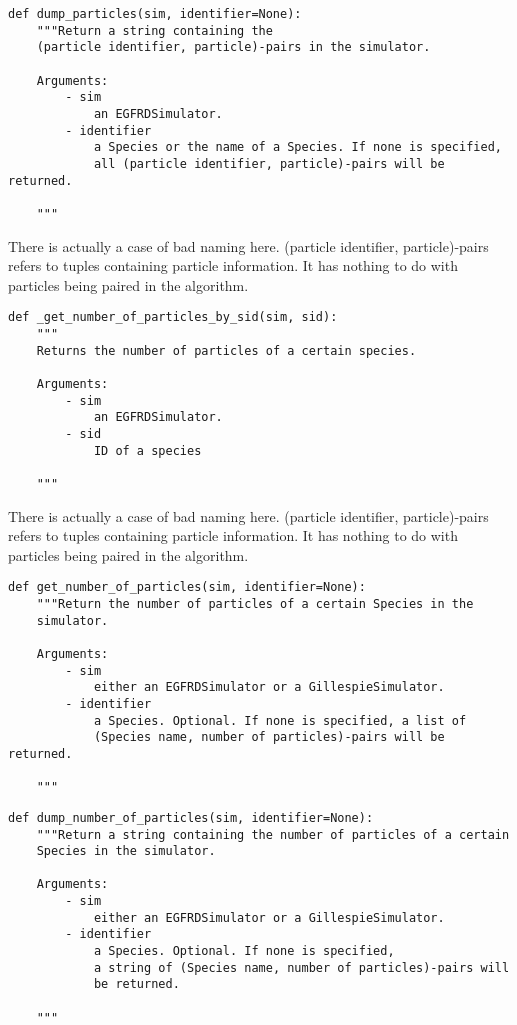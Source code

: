 \documentclass[a4paper,10pt]{article}
\begin{document}
\begin{verbatim}
def dump_particles(sim, identifier=None):
    """Return a string containing the
    (particle identifier, particle)-pairs in the simulator.

    Arguments:
        - sim
            an EGFRDSimulator.
        - identifier
            a Species or the name of a Species. If none is specified, 
            all (particle identifier, particle)-pairs will be returned.

    """
\end{verbatim}
There is actually a case of bad naming here. (particle identifier, particle)-pairs refers to tuples containing particle information. It has nothing to do with particles being paired in the algorithm.

\begin{verbatim}
def _get_number_of_particles_by_sid(sim, sid):
    """ 
    Returns the number of particles of a certain species.

    Arguments:
        - sim
            an EGFRDSimulator.
        - sid
            ID of a species    

    """
\end{verbatim}
There is actually a case of bad naming here. (particle identifier, particle)-pairs refers to tuples containing particle information. It has nothing to do with particles being paired in the algorithm.

\begin{verbatim}
def get_number_of_particles(sim, identifier=None):
    """Return the number of particles of a certain Species in the 
    simulator.

    Arguments:
        - sim
            either an EGFRDSimulator or a GillespieSimulator.
        - identifier
            a Species. Optional. If none is specified, a list of 
            (Species name, number of particles)-pairs will be returned.

    """ 
\end{verbatim}

\begin{verbatim}
def dump_number_of_particles(sim, identifier=None):
    """Return a string containing the number of particles of a certain 
    Species in the simulator.

    Arguments:
        - sim
            either an EGFRDSimulator or a GillespieSimulator.
        - identifier
            a Species. Optional. If none is specified, 
            a string of (Species name, number of particles)-pairs will 
            be returned.

    """ 
\end{verbatim}
\end{document}
